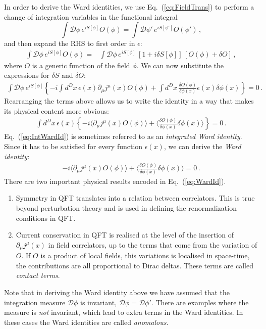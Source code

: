 In order to derive the Ward identities, we use
Eq.~(\ref{eq:FieldTrans}) to perform a change of integration variables
in the functional integral
\begin{equation}
  \label{eq:ChangeOfVars}
  \int \mathcal{D}\phi\, e^{iS[\phi]} O(\phi) = 
  \int \mathcal{D}\phi'\, e^{iS[\phi']} O(\phi') \, ,
\end{equation}
and then expand the RHS to first order in $\epsilon$:
\begin{align}
  \int \mathcal{D}\phi\, e^{iS[\phi]} O(\phi) 
  =& \int \mathcal{D}\phi\, e^{iS[\phi]}\, 
     \left[
     1 + i \delta S[\phi]
     \right]\, 
     \left[
     O(\phi) + \delta O
     \right]
     \, ,
\end{align}
where $O$ is a generic function of the field $\phi$. We can now
substitute the expressions for $\delta S$ and $\delta O$:
\begin{align}
  \int \mathcal{D}\phi\, e^{iS[\phi]} \left\{
  -i \int d^Dx\, \epsilon(x) \partial_\mu j^\mu(x)
  O(\phi) + \int d^Dx\, \frac{\delta O(\phi)}{\delta\phi(x)} \epsilon(x)
  \delta \phi(x)
  \right\} = 0\, .
\end{align}
Rearranging the terms above allows us to write the identity in a way
that makes its physical content more obvious: 
\begin{align}
  \label{eq:IntWardId}
  \int d^Dx\, \epsilon(x) \left\{
  -i \langle \partial_\mu j^\mu(x)
  O(\phi) \rangle +  
  \langle \frac{\delta O(\phi)}{\delta\phi(x)}
  \delta \phi(x) \rangle \right\} = 0\, .
\end{align}
Eq.~(\ref{eq:IntWardId}) is sometimes referred to as an {\em
  integrated Ward identity}. Since it has to be satisfied for every
function $\epsilon(x)$, we can derive the {\em Ward identity}:
\begin{align}
  \label{eq:WardId}
   -i \langle \partial_\mu j^\mu(x)
  O(\phi) \rangle +  
  \langle \frac{\delta O(\phi)}{\delta\phi(x)}
  \delta \phi(x) \rangle = 0\, .
\end{align}
There are two important physical results encoded in Eq.~(\ref{eq:WardId}).
\begin{enumerate}
\item Symmetry in QFT translates into a relation between
  correlators. This is true beyond perturbation theory and is used in
  defining the renormalization conditions in QFT.
\item Current conservation in QFT is realised at the level of the
  insertion of $\partial_\mu j^\mu(x)$ in field correlators, up to
  the terms that come from the variation of $O$. If $O$ is a product
  of local fields, this variations is localised in space-time, \ie the
  contributions are all proportional to Dirac deltas. These terms are
  called {\em contact terms}.  
\end{enumerate}

Note that in deriving the Ward identity above we have assumed that the
integration measure $\mathcal{D}\phi$ is invariant, \ie
$\mathcal{D}\phi=\mathcal{D}\phi'$. There are examples where the
measure is {\em not} invariant, which lead to extra terms in the Ward
identities. In these cases the Ward identities are called {\em
  anomalous}. 
